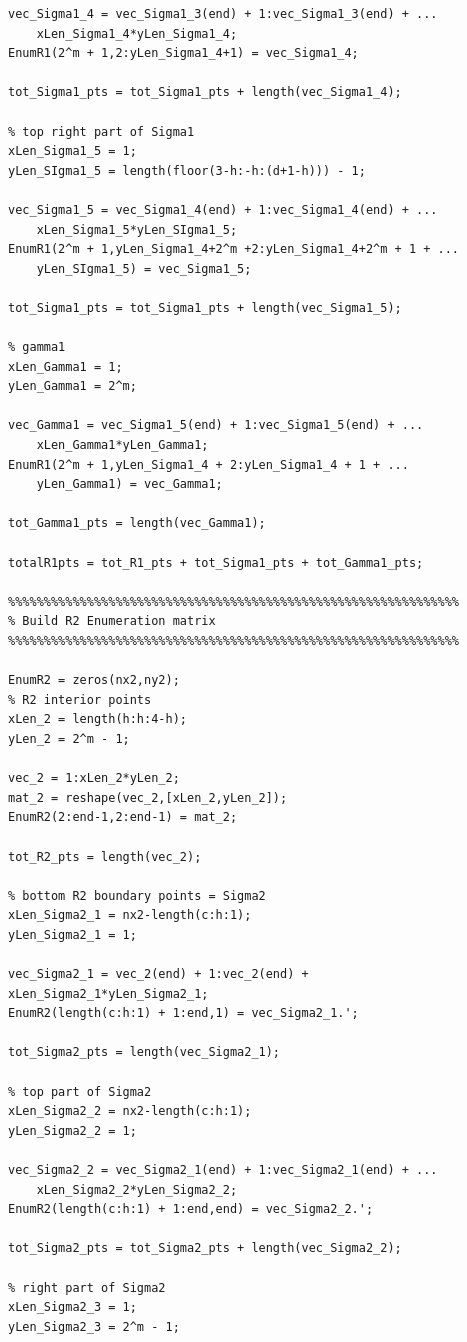 \documentclass[12pt]{article}
\begin{document}
\begin{lstlisting}[caption=Enumeration for all a and b values]
vec_Sigma1_4 = vec_Sigma1_3(end) + 1:vec_Sigma1_3(end) + ...
    xLen_Sigma1_4*yLen_Sigma1_4;
EnumR1(2^m + 1,2:yLen_Sigma1_4+1) = vec_Sigma1_4;

tot_Sigma1_pts = tot_Sigma1_pts + length(vec_Sigma1_4);

% top right part of Sigma1
xLen_Sigma1_5 = 1;
yLen_SIgma1_5 = length(floor(3-h:-h:(d+1-h))) - 1;

vec_Sigma1_5 = vec_Sigma1_4(end) + 1:vec_Sigma1_4(end) + ...
    xLen_Sigma1_5*yLen_SIgma1_5;
EnumR1(2^m + 1,yLen_Sigma1_4+2^m +2:yLen_Sigma1_4+2^m + 1 + ...
    yLen_SIgma1_5) = vec_Sigma1_5;

tot_Sigma1_pts = tot_Sigma1_pts + length(vec_Sigma1_5);

% gamma1
xLen_Gamma1 = 1;
yLen_Gamma1 = 2^m;

vec_Gamma1 = vec_Sigma1_5(end) + 1:vec_Sigma1_5(end) + ...
    xLen_Gamma1*yLen_Gamma1;
EnumR1(2^m + 1,yLen_Sigma1_4 + 2:yLen_Sigma1_4 + 1 + ...
    yLen_Gamma1) = vec_Gamma1;

tot_Gamma1_pts = length(vec_Gamma1);

totalR1pts = tot_R1_pts + tot_Sigma1_pts + tot_Gamma1_pts;

%%%%%%%%%%%%%%%%%%%%%%%%%%%%%%%%%%%%%%%%%%%%%%%%%%%%%%%%%%%%%%%
% Build R2 Enumeration matrix
%%%%%%%%%%%%%%%%%%%%%%%%%%%%%%%%%%%%%%%%%%%%%%%%%%%%%%%%%%%%%%%

EnumR2 = zeros(nx2,ny2);
% R2 interior points
xLen_2 = length(h:h:4-h);
yLen_2 = 2^m - 1;

vec_2 = 1:xLen_2*yLen_2;
mat_2 = reshape(vec_2,[xLen_2,yLen_2]);
EnumR2(2:end-1,2:end-1) = mat_2;

tot_R2_pts = length(vec_2);

% bottom R2 boundary points = Sigma2
xLen_Sigma2_1 = nx2-length(c:h:1);
yLen_Sigma2_1 = 1;

vec_Sigma2_1 = vec_2(end) + 1:vec_2(end) + xLen_Sigma2_1*yLen_Sigma2_1;
EnumR2(length(c:h:1) + 1:end,1) = vec_Sigma2_1.';

tot_Sigma2_pts = length(vec_Sigma2_1);

% top part of Sigma2
xLen_Sigma2_2 = nx2-length(c:h:1);
yLen_Sigma2_2 = 1;

vec_Sigma2_2 = vec_Sigma2_1(end) + 1:vec_Sigma2_1(end) + ...
    xLen_Sigma2_2*yLen_Sigma2_2;
EnumR2(length(c:h:1) + 1:end,end) = vec_Sigma2_2.';

tot_Sigma2_pts = tot_Sigma2_pts + length(vec_Sigma2_2);

% right part of Sigma2
xLen_Sigma2_3 = 1;
yLen_Sigma2_3 = 2^m - 1;


\end{lstlisting}
\end{document}
